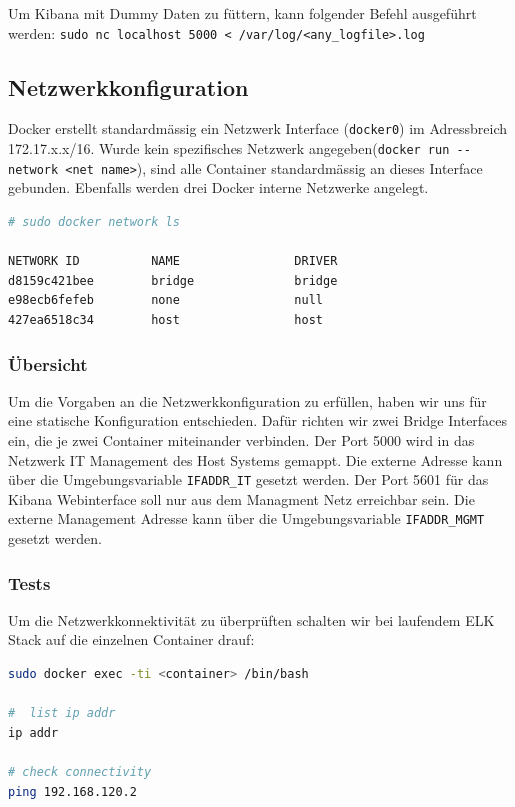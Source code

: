 Um Kibana mit Dummy Daten zu füttern, kann folgender Befehl ausgeführt werden: \lstinline[]|sudo nc localhost 5000 < /var/log/<any_logfile>.log|

\subsection{Netzwerkkonfiguration}
Docker erstellt standardmässig ein Netzwerk Interface (\lstinline[]|docker0|) im Adressbreich 172.17.x.x/16. Wurde kein spezifisches Netzwerk angegeben(\lstinline[]|docker run --network <net name>|), sind alle Container standardmässig an dieses Interface gebunden. Ebenfalls werden drei Docker interne Netzwerke angelegt.
\begin{lstlisting}[language=bash]
# sudo docker network ls

NETWORK ID          NAME                DRIVER
d8159c421bee        bridge              bridge              
e98ecb6fefeb        none                null                
427ea6518c34        host                host    
\end{lstlisting}

\subsubsection{Übersicht}
Um die Vorgaben an die Netzwerkkonfiguration zu erfüllen, haben wir uns für eine statische Konfiguration entschieden. Dafür richten wir zwei Bridge Interfaces ein, die je zwei Container miteinander verbinden. Der Port 5000 wird in das Netzwerk IT Management des Host Systems gemappt. Die externe Adresse kann über die Umgebungsvariable \lstinline[]|IFADDR_IT| gesetzt werden. Der Port 5601 für das Kibana Webinterface soll nur aus dem Managment Netz erreichbar sein. Die externe Management Adresse kann über die Umgebungsvariable \lstinline[]|IFADDR_MGMT| gesetzt werden.

\subsubsection{Tests}
Um die Netzwerkkonnektivität zu überprüften schalten wir bei laufendem ELK Stack auf die einzelnen Container drauf:
\begin{lstlisting}[language=bash]
sudo docker exec -ti <container> /bin/bash

#  list ip addr
ip addr 

# check connectivity
ping 192.168.120.2
\end{lstlisting}

